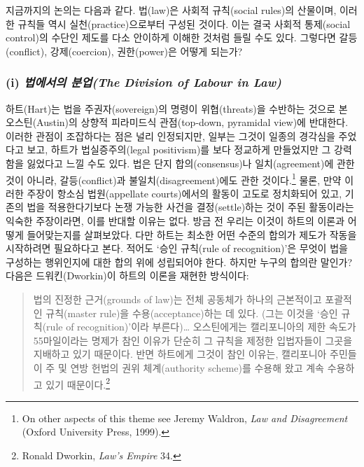\documentclass[12pt, oneside]{book}  %
\begin{document}
지금까지의 논의는 다음과 같다. 법(law)은 사회적 규칙(social rules)의
산물이며, 이러한 규칙들 역시 실천(practice)으로부터 구성된 것이다. 이는
결국 사회적 통제(social control)의 수단인 제도를 다소 안이하게 이해한
것처럼 들릴 수도 있다. 그렇다면 갈등(conflict), 강제(coercion),
권한(power)은 어떻게 되는가?

\subsubsection{\texorpdfstring{(i) \emph{법에서의 분업(The Division of
Labour in
Law)}}{(i) 법에서의 분업(The Division of Labour in Law)}}\label{i-uxbc95uxc5d0uxc11cuxc758-uxbd84uxc5c5the-division-of-labour-in-law}

하트(Hart)는 법을 주권자(sovereign)의 명령이 위협(threats)을 수반하는
것으로 본 오스틴(Austin)의 상향적 피라미드식 관점(top-down, pyramidal
view)에 반대한다. 이러한 관점이 조잡하다는 점은 널리 인정되지만, 일부는
그것이 일종의 경각심을 주었다고 보고, 하트가 법실증주의(legal
positivism)를 보다 정교하게 만들었지만 그 강력함을 잃었다고 느낄 수도
있다. 법은 단지 합의(consensus)나 일치(agreement)에 관한 것이 아니라,
갈등(conflict)과 불일치(disagreement)에도 관한 것이다.\footnote{On other
  aspects of this theme see Jeremy Waldron, \emph{Law and Disagreement}
  (Oxford University Press, 1999).} 물론, 만약 이러한 주장이 항소심
법원(appellate courts)에서의 활동이 고도로 정치화되어 있고, 기존의 법을
적용한다기보다 논쟁 가능한 사건을 결정(settle)하는 것이 주된 활동이라는
익숙한 주장이라면, 이를 반대할 이유는 없다. 방금 전 우리는 이것이 하트의
이론과 어떻게 들어맞는지를 살펴보았다. 다만 하트는 최소한 어떤 수준의
합의가 제도가 작동을 시작하려면 필요하다고 본다. 적어도 `승인 규칙(rule
of recognition)'은 무엇이 법을 구성하는 행위인지에 대한 합의 위에
성립되어야 한다. 하지만 누구의 합의란 말인가? 다음은 드워킨(Dworkin)이
하트의 이론을 재현한 방식이다:

\begin{quote}
법의 진정한 근거(grounds of law)는 전체 공동체가 하나의 근본적이고
포괄적인 규칙(master rule)을 수용(acceptance)하는 데 있다. (그는 이것을
`승인 규칙(rule of recognition)'이라 부른다)\ldots{} 오스틴에게는
캘리포니아의 제한 속도가 55마일이라는 명제가 참인 이유가 단순히 그
규칙을 제정한 입법자들이 그곳을 지배하고 있기 때문이다. 반면 하트에게
그것이 참인 이유는, 캘리포니아 주민들이 주 및 연방 헌법의 권위
체계(authority scheme)를 수용해 왔고 계속 수용하고 있기
때문이다.\footnote{Ronald Dworkin, \emph{Law's Empire} 34.}
\end{quote}
\end{document}
